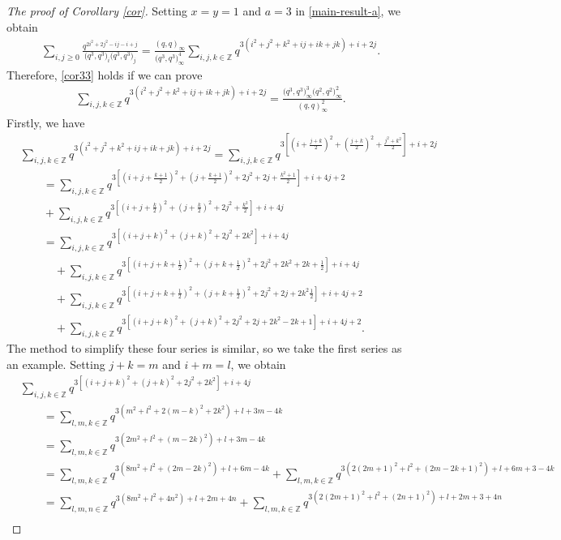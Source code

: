 \documentclass[pdftex]{sigma}
\numberwithin{equation}{section}
\theoremstyle{definition}
\begin{document}
\begin{proof}[The proof of Corollary \ref{cor}]
Setting $x=y=1$ and $a=3$ in \eqref{main-result-a}, we obtain
\begin{align*}
\sum_{i,j\geq0}\frac{q^{2i^2+2j^2-ij-i+j}}{\bigl(q^3,q^3\bigr)_i\bigl(q^3,q^3\bigr)_j} =\frac{(q,q)_{\infty}}{\bigl(q^3,q^3\bigr)^4_{\infty}}\sum_{i,j,k\in\mathbb{Z}}q^{3(i^2+j^2+k^2+ij+ik+jk)+i+2j}.
\end{align*}
Therefore, \eqref{cor33} holds if we can prove
\begin{align}\label{key-33}
\sum_{i,j,k\in\mathbb{Z}}q^{3(i^2+j^2+k^2+ij+ik+jk)+i+2j}=\frac{\bigl(q^3,q^3\bigr)^3_{\infty} \bigl(q^2,q^2\bigr)^2_{\infty}}{(q,q)^2_{\infty}}.
\end{align}
Firstly, we have
\begin{align*}
&\sum_{i,j,k\in\mathbb{Z}}q^{3(i^2+j^2+k^2+ij+ik+jk)+i+2j}=\sum_{i,j,k\in\mathbb{Z}}q^{3[(i+\frac{j+k}{2})^2+(\frac{j+k}{2})^2+\frac{j^2+k^2}{2}]+i+2j}\\
& \qquad =\sum_{i,j,k\in\mathbb{Z}}q^{3[(i+j+\frac{k+1}{2})^2+(j+\frac{k+1}{2})^2+2j^2+2j+\frac{k^2+1}{2}]+i+4j+2} \\ & \qquad +\sum_{i,j,k\in\mathbb{Z}}q^{3[(i+j+\frac{k}{2})^2+(j+\frac{k}{2})^2+2j^2+\frac{k^2}{2}]+i+4j}\\
& \qquad =\sum_{i,j,k\in\mathbb{Z}}q^{3[(i+j+k)^2+(j+k)^2+2j^2+2k^2]+i+4j} \\
& \qquad\quad{} +\sum_{i,j,k\in\mathbb{Z}}q^{3[(i+j+k+\frac{1}{2})^2+(j+k+\frac{1}{2})^2+2j^2+2k^2+2k+\frac{1}{2}]+i+4j}\\
&\qquad\quad{} +\sum_{i,j,k\in\mathbb{Z}}q^{3[(i+j+k+\frac{1}{2})^2+(j+k+\frac{1}{2})^2+2j^2+2j+2k^2\frac{1}{2}]+i+4j+2}\\
&\qquad\quad{} +\sum_{i,j,k\in\mathbb{Z}}q^{3[(i+j+k)^2+(j+k)^2+2j^2+2j+2k^2-2k+1]+i+4j+2}.
\end{align*}
The method to simplify these four series is similar, so we take the first series as an example. Setting $j+k=m$ and $i+m=l$, we obtain
\begin{align*}
&\sum_{i,j,k\in\mathbb{Z}}q^{3[(i+j+k)^2+(j+k)^2+2j^2+2k^2]+i+4j}\\
& \qquad =\sum_{l,m,k\in\mathbb{Z}}q^{3(m^2+l^2+2(m-k)^2+2k^2)+l+3m-4k} \\
& \qquad =\sum_{l,m,k\in\mathbb{Z}}q^{3(2m^2+l^2+(m-2k)^2)+l+3m-4k}\\
& \qquad =\sum_{l,m,k\in\mathbb{Z}}q^{3(8m^2+l^2+(2m-2k)^2)+l+6m-4k}+\sum_{l,m,k\in\mathbb{Z}}q^{3(2(2m+1)^2+l^2+(2m-2k+1)^2)+l+6m+3-4k}\\
& \qquad =\sum_{l,m,n\in\mathbb{Z}}q^{3(8m^2+l^2+4n^2)+l+2m+4n}+\sum_{l,m,k\in\mathbb{Z}}q^{3(2(2m+1)^2+l^2+(2n+1)^2)+l+2m+3+4n}\\

\end{align*}
\end{proof}
\end{document}
